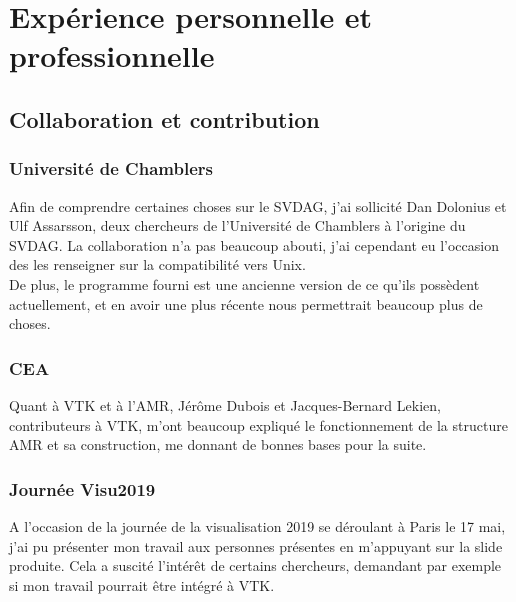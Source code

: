 \documentclass[12pt,a4paper,twoside]{article}
\begin{document}
    \begin{figure}[H]
    \end{figure}

    \section{Expérience personnelle et professionnelle}
    \subsection{Collaboration et contribution}

    \subsubsection{Université de Chamblers}

    Afin de comprendre certaines choses sur le SVDAG, j'ai sollicité Dan Dolonius et Ulf Assarsson, deux chercheurs de l'Université de Chamblers à l'origine du SVDAG.
    La collaboration n'a pas beaucoup abouti, j'ai cependant eu l'occasion des les renseigner sur la compatibilité vers Unix.\\
    De plus, le programme fourni est une ancienne version de ce qu'ils possèdent actuellement, et en avoir une plus récente
    nous permettrait beaucoup plus de choses.

    \subsubsection{CEA}

    Quant à VTK et à l'AMR, Jérôme Dubois et Jacques-Bernard Lekien, contributeurs à VTK, m'ont beaucoup expliqué
    le fonctionnement de la structure AMR et sa construction, me donnant de bonnes bases pour la suite.

    \subsubsection{Journée Visu2019}

    A l'occasion de la journée de la visualisation 2019 se déroulant à Paris le 17 mai, j'ai pu présenter mon travail
    aux personnes présentes en m'appuyant sur la slide produite. Cela a suscité l'intérêt de certains chercheurs,
    demandant par exemple si mon travail pourrait être intégré à VTK.
\end{document}
